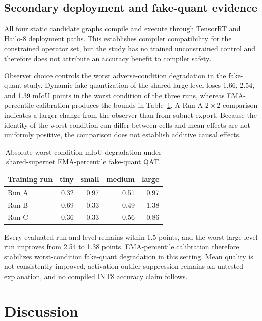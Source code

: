 \documentclass[a4paper,review,12pt]{elsarticle}
\newcommand{\miou}{mIoU}
\begin{document}
\subsection{Secondary deployment and fake-quant evidence}
\label{sec:qatresults}

All four static candidate graphs compile and execute through TensorRT and Hailo-8 deployment paths. This establishes compiler compatibility for the constrained operator set, but the study has no trained unconstrained control and therefore does not attribute an accuracy benefit to compiler safety.

Observer choice controls the worst adverse-condition degradation in the fake-quant study. Dynamic fake quantization of the shared large level loses 1.66, 2.54, and 1.39 \miou{} points in the worst condition of the three runs, whereas EMA-percentile calibration produces the bounds in Table~\ref{tab:qat}. A Run A $2\times2$ comparison indicates a larger change from the observer than from subnet export. Because the identity of the worst condition can differ between cells and mean effects are not uniformly positive, the comparison does not establish additive causal effects.

\begin{table}[H]
\centering
\caption{Absolute worst-condition \miou{} degradation under shared-supernet EMA-percentile fake-quant QAT.}
\label{tab:qat}
\begin{tabular}{@{}lrrrr@{}}
\toprule
Training run & tiny & small & medium & large \\
\midrule
Run A & 0.32 & 0.97 & 0.51 & 0.97 \\
Run B & 0.69 & 0.33 & 0.49 & 1.38 \\
Run C & 0.36 & 0.33 & 0.56 & 0.86 \\
\bottomrule
\end{tabular}
\end{table}

Every evaluated run and level remains within 1.5 points, and the worst large-level run improves from 2.54 to 1.38 points. EMA-percentile calibration therefore stabilizes worst-condition fake-quant degradation in this setting. Mean quality is not consistently improved, activation outlier suppression remains an untested explanation, and no compiled INT8 accuracy claim follows.

\section{Discussion}
\label{sec:discussion}
\end{document}
